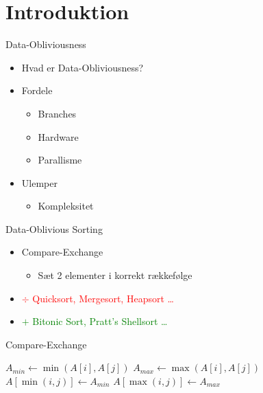\section{Introduktion}

\begin{frame}{Data-Obliviousness}
	\begin{itemize}
		\item Hvad er Data-Obliviousness?

		\item Fordele
		\begin{itemize}
			\item Branches
			\item Hardware
			\item Parallisme
		\end{itemize}

		\item Ulemper
			\begin{itemize}
				\item Kompleksitet
		\end{itemize}
	\end{itemize}
\end{frame}

\begin{frame}{Data-Oblivious Sorting}
	\begin{itemize}
		\item Compare-Exchange
			\begin{itemize}
				\item Sæt 2 elementer i korrekt rækkefølge
			\end{itemize}
		\item \textcolor{red}{$\div$ Quicksort, Mergesort, Heapsort \dots}
		\item \textcolor{green}{$+$ Bitonic Sort, Pratt's Shellsort \dots}
	\end{itemize}
	\begin{block}{Compare-Exchange}
		\begin{algorithmic}
				\State $A_{min} \gets \min(A[i], A[j])$
				\State $A_{max} \gets \max(A[i], A[j])$
				\State $A[\min(i,j)] \gets A_{min}$
				\State $A[\max(i,j)] \gets A_{max}$
			\EndProcedure
		\end{algorithmic}
	\end{block}
\end{frame}

